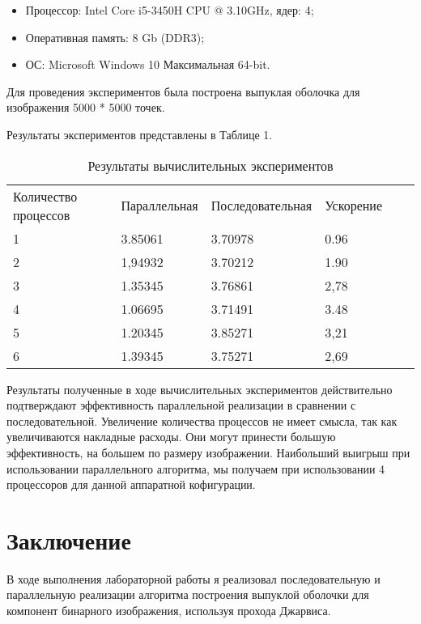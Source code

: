 \documentclass{report}
\begin{document}
\begin{itemize}
\item Процессор: Intel Core i5-3450H CPU @ 3.10GHz, ядер: 4;
\item Оперативная память: 8 Gb (DDR3);
\item ОС: Microsoft Windows 10 Максимальная 64-bit.
\end{itemize}

\par Для проведения экспериментов была построена выпуклая оболочка для изображения 5000 * 5000 точек. 
\par Результаты экспериментов представлены в Таблице 1.

\begin{table}[!h]
\caption{Результаты вычислительных экспериментов}
\centering
\begin{tabular}{llllll}
Количество процессов & Параллельная & Последовательная & Ускорение  \\
1        & 3.85061        & 3.70978      & 0.96                     \\
2        & 1,94932        & 3.70212      & 1.90                     \\
3        & 1.35345        & 3.76861      & 2,78                     \\
4        & 1.06695        & 3.71491      & 3.48                     \\
5        & 1.20345        & 3.85271      & 3,21                     \\
6        & 1.39345        & 3.75271      & 2,69                     \\
\end{tabular}
\end{table}

\par Результаты полученные в ходе вычислительных экспериментов действительно подтверждают эффективность параллельной реализации в сравнении с последовательной. Увеличение количества процессов не имеет смысла, так как увеличиваются накладные расходы. Они могут принести большую эффективность, на большем по размеру изображении. Наибольший выигрыш при использовании параллельного алгоритма, мы получаем при использовании 4 процессоров для данной аппаратной кофигурации.
\newpage

\section*{Заключение}
В ходе выполнения лабораторной работы я реализовал последовательную и параллельную реализации алгоритма построения выпуклой оболочки для компонент бинарного изображения, используя прохода Джарвиса.
\newpage
\end{document}
